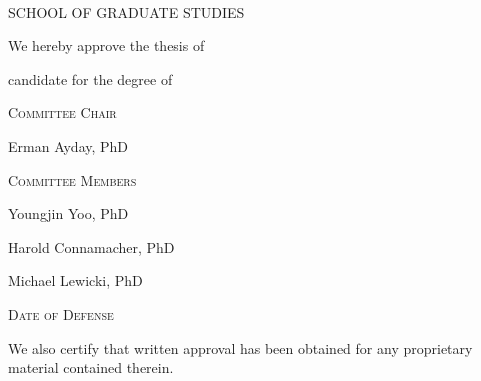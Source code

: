 \begin{center}
\large

\MakeUppercase{\thesisInstitution \\ School of Graduate Studies}

\vspace{0.2in}

We hereby approve the thesis of

\thesisAuthor

candidate for the degree of

\thesisDegree

\vspace{0.2in}

\textsc{Committee Chair}

Erman Ayday, PhD

\vspace{0.2in}

\textsc{Committee Members}

Youngjin Yoo, PhD

Harold Connamacher, PhD

Michael Lewicki, PhD

\vspace{0.2in}

\textsc{Date of Defense}

\thesisDefenseDate

\vspace{0.2in}

We also certify that written approval has been obtained for any proprietary material contained therein.
\end{center}